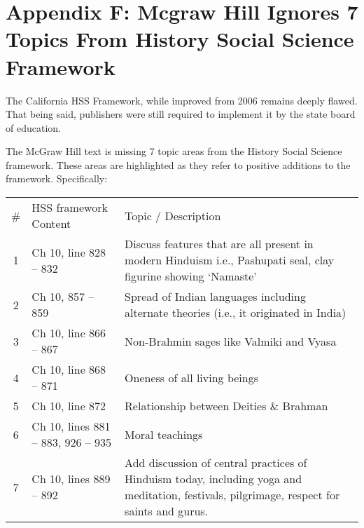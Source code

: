 \chapter{Appendix F: Mcgraw Hill Ignores 7 Topics From History Social Science Framework}

The California HSS Framework, while improved from 2006 remains deeply flawed. That being said, publishers were still required to implement it by the state board of education.

The McGraw Hill text is missing 7 topic areas from the History Social Science framework. These areas are highlighted as they refer to positive additions to the framework. Specifically:

\begin{tabular}{|c|p{3cm}|p{6cm}|}
\hline 
\# & HSS framework Content & Topic / Description\\
1 & Ch 10, line 828 – 832 &  Discuss features that are all present in modern Hinduism i.e., Pashupati seal, clay figurine showing ‘Namaste’\\
2 & Ch 10, 857 – 859 & Spread of Indian languages including alternate theories (i.e., it originated in India)\\ 
3 & Ch 10, line 866 – 867 & Non-Brahmin sages like Valmiki and Vyasa\\ 
4 & Ch 10, line 868 – 871 & Oneness of all living beings\\ 
5 & Ch 10, line 872 & Relationship between Deities \& Brahman\\ 
6 & Ch 10, lines 881 – 883, 926 – 935 & Moral teachings\\ 
7 & Ch 10, lines 889 – 892 & Add discussion of central practices of Hinduism today, including yoga and meditation, festivals, pilgrimage, respect for saints and gurus.\\
\end{tabular}

